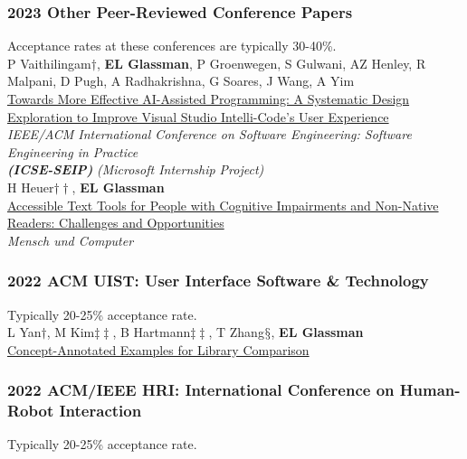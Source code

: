 \documentclass[10pt, a4paper]{article}
\newcommand{\years}[1]{\marginnote{\normalsize #1}}
\begin{document}
\subsubsection*{2023 Other Peer-Reviewed Conference Papers}
Acceptance rates at these conferences are typically 30-40\%.\\

\years{\textbf{C28}}P Vaithilingam$\dagger$, \textbf{EL Glassman}, P Groenwegen, S Gulwani, AZ Henley, R Malpani, D Pugh, A Radhakrishna, G Soares, J Wang, A Yim\\ \href{http://glassmanlab.seas.harvard.edu/papers/Vaithilingam2023ICSE_IntelliCode.pdf}{Towards More Effective AI-Assisted Programming: A Systematic Design Exploration to Improve Visual Studio Intelli-Code’s User Experience}\\
\emph{IEEE/ACM International Conference on Software Engineering: Software Engineering in Practice\\
\textbf{(ICSE-SEIP)}} \textit{(Microsoft Internship Project)}\\[0.2cm]
\years{\textbf{C27}}H Heuer$\dagger\dagger$, \textbf{EL Glassman}\\
\href{http://glassmanlab.seas.harvard.edu/papers/accessible_text_tools_MuC23.pdf}{Accessible Text Tools for People with Cognitive Impairments and Non-Native Readers: Challenges and Opportunities}\\
\emph{Mensch und Computer}

\subsubsection*{2022 ACM \textbf{UIST}: User Interface Software \& Technology }
Typically 20-25\% acceptance rate.\\

\years{\textbf{C26}}L Yan$\dagger$, M Kim$\ddagger\ddagger$, B Hartmann$\ddagger\ddagger$, T Zhang$\mathsection$, \textbf{EL Glassman}\\ \href{http://glassmanlab.seas.harvard.edu/papers/paralib_uist22.pdf}{Concept-Annotated Examples for Library Comparison}

\subsubsection*{2022 ACM/IEEE \textbf{HRI}: International Conference on Human-Robot Interaction}
Typically 20-25\% acceptance rate.\\
\end{document}
